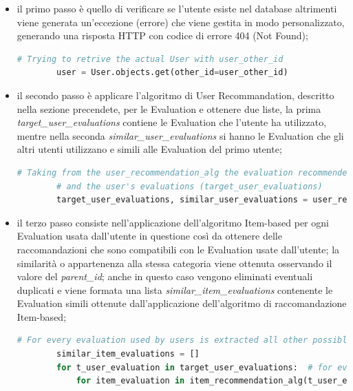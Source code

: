\begin{itemize}
    \item il primo passo è quello di verificare se l'utente esiste nel database altrimenti viene generata un’eccezione (errore) che viene gestita in 
    modo personalizzato, generando una risposta HTTP con codice di errore 404 (Not Found);
    \begin{lstlisting}[language=Python, label=lst:CF_Hybrid_Evaluation_2]
        # Trying to retrive the actual User with user_other_id
        user = User.objects.get(other_id=user_other_id)
    \end{lstlisting} 
    \item il secondo passo è applicare l'algoritmo di User Recommandation, descritto nella sezione precendete, per le Evaluation e ottenere due liste, 
    la prima \textit{target\_user\_evaluations} contiene le Evaluation che l'utente ha utilizzato, mentre nella seconda \textit{similar\_user\_evaluations} 
    si hanno le Evaluation che gli altri utenti utilizzano e simili alle Evaluation del primo utente;
    \begin{lstlisting}[language=Python, label=lst:CF_Hybrid_Evaluation_3]
        # Taking from the user_recommendation_alg the evaluation recommended from this approach (similar_user_evaluations)
        # and the user's evaluations (target_user_evaluations)
        target_user_evaluations, similar_user_evaluations = user_recommendation_alg(user_other_id)
    \end{lstlisting} 
    \item il terzo passo consiste nell'applicazione dell'algoritmo Item-based per ogni Evaluation usata dall'utente in questione così da ottenere 
    delle raccomandazioni che sono compatibili con le Evaluation usate dall'utente; la similarità o appartenenza alla stessa categoria viene 
    ottenuta osservando il valore del \textit{parent\_id}; anche in questo caso vengono eliminati eventuali duplicati e viene formata una lista 
    \textit{similar\_item\_evaluations} contenente le Evaluation simili ottenute dall'applicazione dell'algoritmo di raccomandazione Item-based;
    \begin{lstlisting}[language=Python, label=lst:CF_Hybrid_Evaluation_4]
        # For every evaluation used by users is extracted all other possible evaluations that have the same 'parent_id'
        similar_item_evaluations = []
        for t_user_evaluation in target_user_evaluations:  # for every target user's evaluations
            for item_evaluation in item_recommendation_alg(t_user_evaluation['other_id']):  # is applied the item_recommendation algorithm

\end{lstlisting}
\end{itemize}
